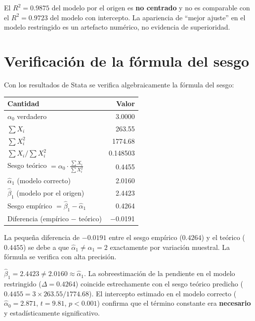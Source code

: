 \documentclass[12pt, letterpaper]{article}
\begin{document}
\begin{clave}
  El $R^2 = 0.9875$ del modelo por el origen es \textbf{no centrado} y no
  es comparable con el $R^2 = 0.9723$ del modelo con intercepto. La
  apariencia de ``mejor ajuste'' en el modelo restringido es un artefacto
  numérico, no evidencia de superioridad.
\end{clave}

\section{Verificación de la fórmula del sesgo}

Con los resultados de Stata se verifica algebraicamente la fórmula del sesgo:

\begin{center}
\renewcommand{\arraystretch}{1.3}
\small
\begin{tabular}{lr}
\toprule
\textbf{Cantidad} & \textbf{Valor} \\
\midrule
$\alpha_0$ verdadero                              &  3.0000 \\
$\sum X_i$                                        & 263.55 \\
$\sum X_i^2$                                      & 1774.68 \\
$\sum X_i / \sum X_i^2$                           &  0.148503 \\
Sesgo teórico $= \alpha_0 \cdot \frac{\sum X_i}{\sum X_i^2}$ & 0.4455 \\
\midrule
$\hat{\alpha}_1$ (modelo correcto)                &  2.0160 \\
$\hat{\beta}_1$  (modelo por el origen)           &  2.4423 \\
Sesgo empírico $= \hat{\beta}_1 - \hat{\alpha}_1$ &  0.4264 \\
Diferencia (empírico $-$ teórico)                 & $-$0.0191 \\
\bottomrule
\end{tabular}
\end{center}

La pequeña diferencia de $-0.0191$ entre el sesgo empírico ($0.4264$) y el
teórico ($0.4455$) se debe a que $\hat{\alpha}_1 \neq \alpha_1 = 2$ exactamente
por variación muestral. La fórmula se verifica con alta precisión.

\begin{clave}
  $\hat{\beta}_1 = 2.4423 \neq 2.0160 \approx \hat{\alpha}_1$. La
  sobreestimación de la pendiente en el modelo restringido
  ($\Delta = 0.4264$) coincide estrechamente con el sesgo teórico predicho
  ($0.4455 = 3 \times 263.55/1774.68$). El intercepto estimado en el modelo
  correcto ($\hat{\alpha}_0 = 2.871$, $t = 9.81$, $p < 0.001$) confirma que
  el término constante era \textbf{necesario} y estadísticamente significativo.
\end{clave}
\end{document}
